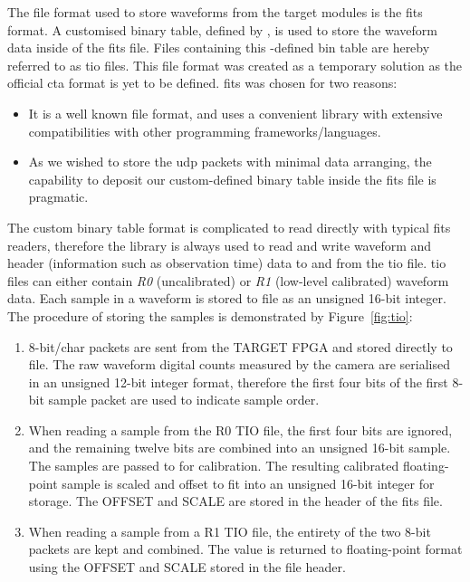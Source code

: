 \noindent The file format used to store waveforms from the \gls{target} modules is the \gls{fits} format. A customised binary table, defined by , is used to store the waveform data inside of the \gls{fits} file. Files containing this -defined bin table are hereby referred to as \gls{tio} files. This file format was created as a temporary solution as the official \gls{cta} format is yet to be defined. \gls{fits} was chosen for two reasons:
\begin{itemize}
\item It is a well known file format, and uses a convenient library with extensive compatibilities with other programming frameworks/languages.
\item As we wished to store the \gls{udp} packets with minimal data arranging, the capability to deposit our custom-defined binary table inside the \gls{fits} file is pragmatic.
\end{itemize}
The custom binary table format is complicated to read directly with typical \gls{fits} readers, therefore the  library is always used to read and write waveform and header (information such as observation time) data to and from the \gls{tio} file. \gls{tio} files can either contain \textit{R0} (uncalibrated)  or \textit{R1} (low-level calibrated) waveform data. Each sample in a waveform is stored to file as an unsigned 16-bit integer. The procedure of storing the samples is demonstrated by Figure~\ref{fig:tio}:
\begin{enumerate}[label={\arabic*)}]
	\item 8-bit/char packets are sent from the TARGET FPGA and stored directly to file. The raw waveform digital counts measured by the camera are serialised in an unsigned 12-bit integer format, therefore the first four bits of the first 8-bit sample packet are used to indicate sample order.
  	\item When reading a sample from the R0 TIO file, the first four bits are ignored, and the remaining twelve bits are combined into an unsigned 16-bit sample. The samples are passed to  for calibration. The resulting calibrated floating-point sample is scaled and offset to fit into an unsigned 16-bit integer for storage. The OFFSET and SCALE are stored in the header of the \gls{fits} file.
  	\item When reading a sample from a R1 TIO file, the entirety of the two 8-bit packets are kept and combined. The value is returned to floating-point format using the OFFSET and SCALE stored in the file header.
\end{enumerate}

